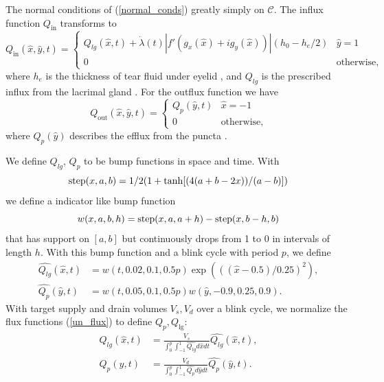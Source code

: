 The normal conditions of (\ref{normal_conds}) greatly simply on $\mathcal{C}$. The influx function $Q_{\text{in}}$ transforms to
\begin{equation}
Q_{\text{in}}(\hat{x},\hat{y},t) = \begin{cases}
Q_{lg}(\hat{x},t) + \dot{\lambda}(t)|f'(g_x(\hat{x})+i g_y(\hat{x}))|(h_0-h_e/2) & \hat{y}=1 \\
0 & \text{otherwise},
\end{cases}
\label{influx_fun}
\end{equation}
where $h_e$ is the thickness of tear fluid under eyelid \cite{heryudono2007single}, and $Q_{lg}$ is the prescribed influx from the lacrimal gland \cite{braun2015dynamics}. For the outflux function we have
\begin{equation}
Q_{\text{out}}(\hat{x},\hat{y},t) = \begin{cases}
Q_{p}(\hat{y},t) & \hat{x}=-1 \\
0 & \text{otherwise},
\end{cases}
\label{out_flux_fun}
\end{equation}
where $Q_{p}(\hat{y})$ describes the efflux from the puncta \cite{braun2015dynamics}.

We define $Q_{lg}$, $Q_{p}$ to be bump functions in space and time. With
\begin{equation}
\operatorname{step}(x,a,b) = 1/2 (1 + \tanh[(4 (a + b - 2 x))/(a - b)])
\end{equation}
we define a indicator like bump function
\begin{equation}
w(x,a,b,h) = \operatorname{step}(x,a,a+h)-\operatorname{step}(x,b-h,b)
\end{equation}
that has support on $[a,b]$ but continuously drops from 1 to 0 in intervals of length $h$. With this bump function and a blink cycle with period $p$, we define
\begin{eqnarray}
\hat{Q_{lg}}(\hat{x},t) &= w(t,0.02,0.1,0.5 p) \exp(((\hat{x}-0.5)/0.25)^2), \label{bumb_funs}  \\
\hat{Q_{p}}(\hat{y},t) &= w(t,0.05,0.1,0.5 p) w(\hat{y},-0.9,0.25,0.9). 
\end{eqnarray}
With target supply and drain volumes $V_s, V_d$ over a blink cycle, we normalize the flux functions (\ref{un_flux}) to define $Q_p,Q_{\lg}$:
\begin{eqnarray}
Q_{lg}(\hat{x},t) &= \frac{V_s}{\int_{0}^{p} \int_{-1}^1 \hat{Q_{lg}} d\hat{x} dt} \hat{Q_{lg}}(\hat{x},t), \\
Q_{p}(\hat{y},t) &= \frac{V_d}{\int_{0}^{p} \int_{-1}^1 \hat{Q_{p}} d\hat{y} dt} \hat{Q_{p}}(\hat{y},t).
\label{un_flux}
\end{eqnarray}
